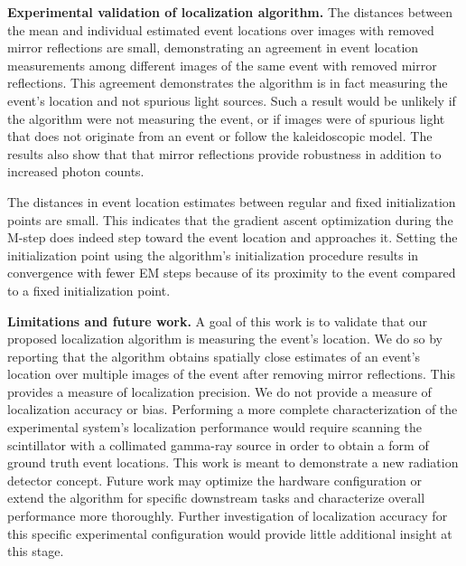 \noindent
\textbf{Experimental validation of localization algorithm.}
The distances between the mean and individual estimated event locations over 
images with removed mirror reflections are small, demonstrating an agreement in 
event location measurements among different images of the same event with removed 
mirror reflections.
This agreement demonstrates the algorithm is in fact measuring the event's 
location and not spurious light sources.
Such a result would be unlikely if the algorithm were not measuring the event, or 
if images were of spurious light that does not originate from an event or follow 
the kaleidoscopic model.
The results also show that that mirror reflections provide robustness in 
addition to increased photon counts.

The distances in event location estimates between regular and fixed 
initialization points are small.
This indicates that the gradient ascent optimization during the M-step does indeed 
step toward the event location and approaches it.
Setting the initialization point using the algorithm's initialization procedure 
results in convergence with fewer EM steps because of its proximity to the event 
compared to a fixed initialization point. 

\noindent
\textbf{Limitations and future work.}
A goal of this work is to validate that our proposed localization algorithm is 
measuring the event's location.
We do so by reporting that the algorithm obtains spatially close estimates of an 
event's location over multiple images of the event after removing mirror reflections.
This provides a measure of localization precision.
We do not provide a measure of localization accuracy or bias.
Performing a more complete characterization of the experimental system's 
localization performance would require scanning the scintillator with a collimated 
gamma-ray source in order to obtain a form of ground truth event locations.
This work is meant to demonstrate a new radiation detector concept.
Future work may optimize the hardware configuration or extend the algorithm for 
specific downstream tasks and characterize overall performance more thoroughly.
Further investigation of localization accuracy for this specific experimental 
configuration would provide little additional insight at this stage.

